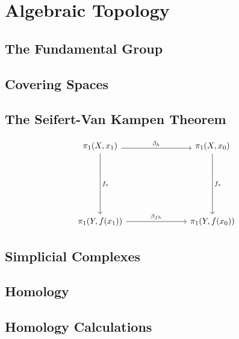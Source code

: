\documentclass[main.tex]{subfiles}
\begin{document}
	\chapter{Algebraic Topology}
		\section{The Fundamental Group}
		
		\section{Covering Spaces}
		
		\section{The Seifert-Van Kampen Theorem}
		\begin{equation*}
				\begin{tikzcd}[column sep = 0.5in, row sep=1in]
				{\pi_1(X,x_1)} \arrow[rr, "\beta_h", shift right] \arrow[d, "f_\ast"] &  & {\pi_1(X,x_0)} \arrow[d, "f_\ast"] \\
				{\pi_1(Y,f(x_1))} \arrow[rr, "\beta_{fh}"]                            &  & {\pi_1(Y,f(x_0))}                 
				\end{tikzcd}
		\end{equation*}
		\section{Simplicial Complexes}
		
		\section{Homology}
		
		\section{Homology Calculations}
				
\end{document}
